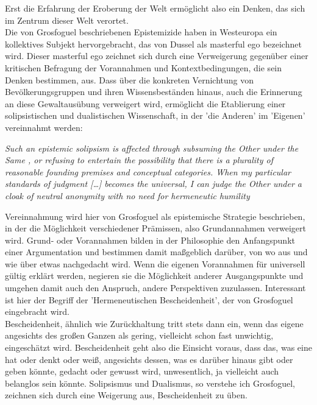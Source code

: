 Erst die Erfahrung der Eroberung der Welt ermöglicht also
ein Denken, das sich im Zentrum dieser Welt verortet. \\
 Die von Grosfoguel
beschriebenen Epistemizide haben in Westeuropa ein kollektives Subjekt
hervorgebracht, das von Dussel als \glqq masterful ego \grqq \footnotemark
{} bezeichnet wird. Dieser
\glqq masterful ego \grqq zeichnet sich durch eine Verweigerung gegenüber einer
kritischen Befragung der Vorannahmen und Kontextbedingungen, die sein Denken
bestimmen, aus. Dass über die konkreten Vernichtung von Bevölkerungsgruppen und
ihren Wissensbeständen hinaus, auch die Erinnerung an diese Gewaltausübung
verweigert wird, ermöglicht die Etablierung einer solipsistischen und
dualistischen Wissenschaft, in der 'die Anderen' im 'Eigenen' vereinnahmt
werden:
\begin{myenv} 
  \textit{\glqq Such an epistemic solipsism is affected through
    subsuming  \glqq the Other under the Same \grqq, or refusing to entertain the
    possibility that there is a plurality of reasonable founding premises and
    conceptual categories. When my particular standards of judgment […] becomes
    the universal, I can judge the Other under a cloak of neutral anonymity
    with no need for hermeneutic humility
    \grqq \footnotemark {}
 }
\end{myenv}

Vereinnahmung wird hier von Grosfoguel als epistemische Strategie beschrieben,
in der die Möglichkeit verschiedener Prämissen, also Grundannahmen verweigert
wird. Grund- oder Vorannahmen bilden in der Philosophie den Anfangspunkt einer
Argumentation und bestimmen damit maßgeblich darüber, von wo aus und wie über
etwas nachgedacht wird. Wenn die eigenen Vorannahmen für universell gültig
erklärt werden, negieren sie die Möglichkeit anderer Ausgangspunkte und umgehen
damit auch den Anspruch, andere Perspektiven zuzulassen. Interessant ist hier
der Begriff der 'Hermeneutischen Bescheidenheit', der von Grosfoguel
eingebracht wird. \\
Bescheidenheit, ähnlich wie Zurückhaltung tritt stets dann
ein, wenn das eigene angesichts des großen Ganzen als gering, vielleicht schon
fast unwichtig, eingeschätzt wird. Bescheidenheit geht also die Einsicht
voraus, dass das, was eine hat oder denkt oder weiß, angesichts dessen, was es
darüber hinaus gibt oder geben könnte, gedacht oder gewusst wird, unwesentlich,
ja vielleicht auch belanglos sein könnte. Solipsismus und Dualismus, so
verstehe ich Grosfoguel, zeichnen sich durch eine Weigerung aus, Bescheidenheit
zu üben. 
\\

